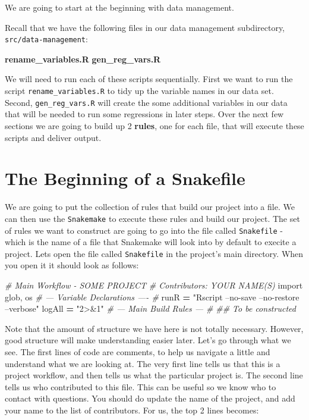 \documentclass[]{book}
\newenvironment{Shaded}{\begin{snugshade}}{\end{snugshade}}
\newcommand{\KeywordTok}[1]{\textcolor[rgb]{0.13,0.29,0.53}{\textbf{{#1}}}}
\newcommand{\StringTok}[1]{\textcolor[rgb]{0.31,0.60,0.02}{{#1}}}
\newcommand{\ImportTok}[1]{{#1}}
\newcommand{\CommentTok}[1]{\textcolor[rgb]{0.56,0.35,0.01}{\textit{{#1}}}}
\newcommand{\OperatorTok}[1]{\textcolor[rgb]{0.81,0.36,0.00}{\textbf{{#1}}}}
\newcommand{\NormalTok}[1]{{#1}}
\theoremstyle{definition}
\theoremstyle{definition}
\theoremstyle{definition}
\theoremstyle{remark}
\begin{document}
We are going to start at the beginning with data management.

Recall that we have the following files in our data management
subdirectory, \texttt{src/data-management}:

\begin{Shaded}
\begin{Highlighting}[]
\KeywordTok{rename_variables.R}
\KeywordTok{gen_reg_vars.R}
\end{Highlighting}
\end{Shaded}

We will need to run each of these scripts sequentially. First we want to
run the script \texttt{rename\_variables.R} to tidy up the variable
names in our data set. Second, \texttt{gen\_reg\_vars.R} will create the
some additional variables in our data that will be needed to run some
regressions in later steps. Over the next few sections we are going to
build up 2 \textbf{rules}, one for each file, that will execute these
scripts and deliver output.

\section{The Beginning of a
Snakefile}\label{the-beginning-of-a-snakefile}

We are going to put the collection of rules that build our project into
a file. We can then use the \texttt{Snakemake} to execute these rules
and build our project. The set of rules we want to construct are going
to go into the file called \texttt{Snakefile} - which is the name of a
file that Snakemake will look into by default to execite a project. Lets
open the file called \texttt{Snakefile} in the project's main directory.
When you open it it should look as follows:

\begin{Shaded}
\begin{Highlighting}[]
\CommentTok{# Main Workflow - SOME PROJECT}
\CommentTok{# Contributors: YOUR NAME(S)}
\ImportTok{import} \NormalTok{glob, os}
\CommentTok{# --- Variable Declarations ---- #}
\NormalTok{runR }\OperatorTok{=} \StringTok{"Rscript --no-save --no-restore --verbose"}
\NormalTok{logAll }\OperatorTok{=} \StringTok{"2>&1"}
\CommentTok{# --- Main Build Rules --- #}
\CommentTok{## To be constructed}
\end{Highlighting}
\end{Shaded}

Note that the amount of structure we have here is not totally necessary.
However, good structure will make understanding easier later. Let's go
through what we see. The first lines of code are comments, to help us
navigate a little and understand what we are looking at. The very first
line tells us that this is a project workflow, and then tells us what
the particular project is. The second line tells us who contributed to
this file. This can be useful so we know who to contact with questions.
You should do update the name of the project, and add your name to the
list of contributors. For us, the top 2 lines becomes:
\end{document}

